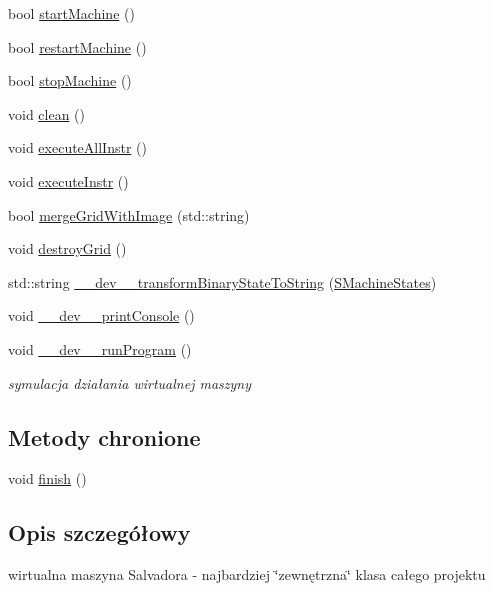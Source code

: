 \begin{CompactItemize}
\item 
bool \hyperlink{classSVirtualMachine_49e93dd25b48a8dbba896f9b2964c526}{startMachine} ()
\item 
bool \hyperlink{classSVirtualMachine_5be1048d2d6f330994a10032d9609277}{restartMachine} ()
\item 
bool \hyperlink{classSVirtualMachine_81211b6ef712dbc4a147d7fa86aed440}{stopMachine} ()
\item 
void \hyperlink{classSVirtualMachine_85f2b4a688a077283010a11145289110}{clean} ()
\item 
void \hyperlink{classSVirtualMachine_f3874f10dac15f27b23dc4b976271413}{executeAllInstr} ()
\item 
void \hyperlink{classSVirtualMachine_200c4aae4eedf52ba7a3754295505186}{executeInstr} ()
\item 
bool \hyperlink{classSVirtualMachine_0257c841ecfbb17f2c85ffd2d8764de8}{mergeGridWithImage} (std::string)
\item 
void \hyperlink{classSVirtualMachine_74f8812f8711a172f9ad3a3f92446af7}{destroyGrid} ()
\item 
std::string \hyperlink{classSVirtualMachine_f8e1ef67bff80a4ce0aa7afc741a1a93}{\_\-\_\-dev\_\-\_\-transformBinaryStateToString} (\hyperlink{senums_8h_c31b206c0c7cd52b9a0b18204f373c7e}{SMachineStates})
\item 
void \hyperlink{classSVirtualMachine_21b1ac24c7018fd084a553a66f5827ea}{\_\-\_\-dev\_\-\_\-printConsole} ()
\item 
void \hyperlink{classSVirtualMachine_d07f353daaf626f5efeb8bd34818db75}{\_\-\_\-dev\_\-\_\-runProgram} ()
\begin{CompactList}\small\item\em symulacja działania wirtualnej maszyny \item\end{CompactList}\end{CompactItemize}
\subsection*{Metody chronione}
\begin{CompactItemize}
\item 
void \hyperlink{classSVirtualMachine_5eb2195ecac5f0bed11b2318cf8feed2}{finish} ()
\end{CompactItemize}


\subsection{Opis szczegółowy}
wirtualna maszyna Salvadora - najbardziej \char`\"{}zewnętrzna\char`\"{} klasa całego projektu 

